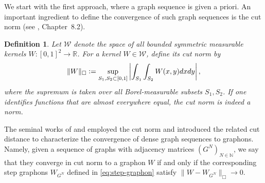 \documentclass[11pt]{article}
\newcommand{\R}{{\mathbb R}}
\newcommand{\N}{{\mathbb N}}
\newcommand{\be}{\begin{equation}}
\newcommand{\ee}{\end{equation}}
\newtheorem{definition}[theorem]{Definition}
\numberwithin{equation}{section}
\begin{document}
We start with the first approach, where a graph sequence is given a priori. An important ingredient to define the convergence of such graph sequences is the cut norm (see \cite{lovasz2012large}, Chapter~8.2).
\begin{definition}
Let $\mathcal{W}$ denote the space of all bounded symmetric measurable kernels $W:[0,1]^2\to\R$. For a kernel $W\in\mathcal{W}$, define its cut norm by
\be\label{eq:cut-norm}
\|W\|_\Box \vcentcolon= \sup_{S_1,S_2\subset [0,1]}\left|\int_{S_1}\int_{S_2} W(x,y)dxdy\right|,
\ee
where the supremum is taken over all Borel-measurable subsets $S_1,S_2$. If one identifies functions that are almost everywhere equal, the cut norm is indeed a norm.
\end{definition} 

The seminal works of \citet{lovasz2006limits} and \citet{borgs2008convergent,borgs2012convergent} employed the cut norm and introduced the related cut distance to characterize the convergence of dense graph sequences to graphons. Namely, given a sequence of graphs with adjacency matrices $(G^N)_{N\in\N}$, we say that they converge in cut norm to a graphon $W$ if and only if the corresponding step graphons $W_{G^N}$ defined in \eqref{eq:step-graphon} satisfy $\|W-W_{G^N}\|_\Box\to 0$. 
\end{document}
